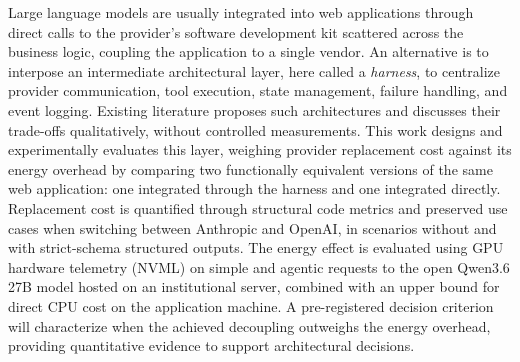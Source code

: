 Large language models are usually integrated into web applications through
direct calls to the provider's software development kit scattered across the
business logic, coupling the application to a single vendor. An alternative is
to interpose an intermediate architectural layer, here called a
\textit{harness}, to centralize provider communication, tool execution, state
management, failure handling, and event logging. Existing literature proposes
such architectures and discusses their trade-offs qualitatively, without
controlled measurements. This work designs and experimentally evaluates this
layer, weighing provider replacement cost against its energy overhead by
comparing two functionally equivalent versions of the same web application: one
integrated through the harness and one integrated directly. Replacement cost is
quantified through structural code metrics and preserved use cases when
switching between Anthropic and OpenAI, in scenarios without and with
strict-schema structured outputs. The energy effect is evaluated using GPU
hardware telemetry (NVML) on simple and agentic requests to the open Qwen3.6 27B
model hosted on an institutional server, combined with an upper bound for direct
CPU cost on the application machine. A pre-registered decision criterion will
characterize when the achieved decoupling outweighs the energy overhead,
providing quantitative evidence to support architectural decisions.

